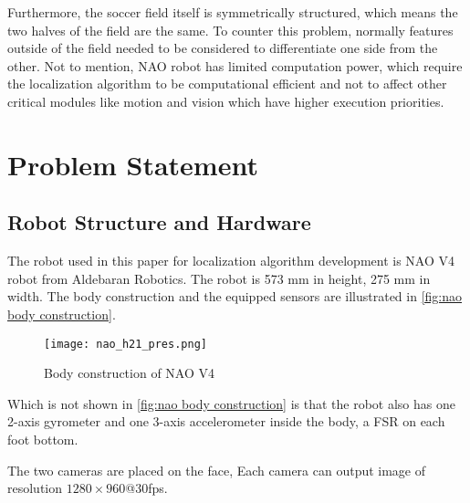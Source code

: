 Furthermore, the soccer field itself is symmetrically structured, which means the two halves of the field are the same. To counter this problem, normally features outside of the field needed to be considered to differentiate one side from the other.
Not to mention,  NAO robot has limited computation power, which require the localization algorithm to be computational efficient and not to affect other critical modules like motion and vision which have higher execution priorities.




\section{Problem Statement}
\subsection{Robot Structure and Hardware}\label{sub:hardware}
The robot used in this paper for localization algorithm development is NAO V4 robot from Aldebaran Robotics{\textregistered}. The robot is 573 mm in height, 275 mm in width. The body construction and the equipped sensors are illustrated in \autoref{fig:nao body construction}.

\begin{figure}[h!]
  \centering
  \texttt{[image: nao\_h21\_pres.png]}
  \caption{Body construction of NAO V4}
  \label{fig:nao body construction}
\end{figure}

Which is not shown in \autoref{fig:nao body construction} is that the robot also has one 2-axis gyrometer and one 3-axis accelerometer inside the body, a \gls{FSR} on each foot bottom. 

The two cameras are placed on the face, Each camera can output image of resolution $1280 \times 960$@30fps. %


